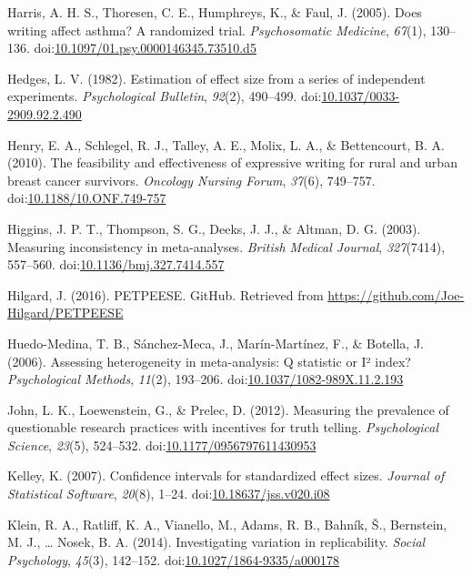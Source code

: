 \documentclass[english,man]{apa6}
\theoremstyle{definition}
\theoremstyle{definition}
\theoremstyle{definition}
\theoremstyle{remark}
\begin{document}
\hypertarget{ref-Harris2005}{}
Harris, A. H. S., Thoresen, C. E., Humphreys, K., \& Faul, J. (2005).
Does writing affect asthma? A randomized trial. \emph{Psychosomatic
Medicine}, \emph{67}(1), 130--136.
doi:\href{https://doi.org/10.1097/01.psy.0000146345.73510.d5}{10.1097/01.psy.0000146345.73510.d5}

\hypertarget{ref-Hedges1982}{}
Hedges, L. V. (1982). Estimation of effect size from a series of
independent experiments. \emph{Psychological Bulletin}, \emph{92}(2),
490--499.
doi:\href{https://doi.org/10.1037/0033-2909.92.2.490}{10.1037/0033-2909.92.2.490}

\hypertarget{ref-Henry2010}{}
Henry, E. A., Schlegel, R. J., Talley, A. E., Molix, L. A., \&
Bettencourt, B. A. (2010). The feasibility and effectiveness of
expressive writing for rural and urban breast cancer survivors.
\emph{Oncology Nursing Forum}, \emph{37}(6), 749--757.
doi:\href{https://doi.org/10.1188/10.ONF.749-757}{10.1188/10.ONF.749-757}

\hypertarget{ref-Higgins2003}{}
Higgins, J. P. T., Thompson, S. G., Deeks, J. J., \& Altman, D. G.
(2003). Measuring inconsistency in meta-analyses. \emph{British Medical
Journal}, \emph{327}(7414), 557--560.
doi:\href{https://doi.org/10.1136/bmj.327.7414.557}{10.1136/bmj.327.7414.557}

\hypertarget{ref-Hilgard2016}{}
Hilgard, J. (2016). PETPEESE. GitHub. Retrieved from
\url{https://github.com/Joe-Hilgard/PETPEESE}

\hypertarget{ref-Huedo-Medina2006}{}
Huedo-Medina, T. B., Sánchez-Meca, J., Marín-Martínez, F., \& Botella,
J. (2006). Assessing heterogeneity in meta-analysis: Q statistic or I²
index? \emph{Psychological Methods}, \emph{11}(2), 193--206.
doi:\href{https://doi.org/10.1037/1082-989X.11.2.193}{10.1037/1082-989X.11.2.193}

\hypertarget{ref-John2012}{}
John, L. K., Loewenstein, G., \& Prelec, D. (2012). Measuring the
prevalence of questionable research practices with incentives for truth
telling. \emph{Psychological Science}, \emph{23}(5), 524--532.
doi:\href{https://doi.org/10.1177/0956797611430953}{10.1177/0956797611430953}

\hypertarget{ref-Kelley2007}{}
Kelley, K. (2007). Confidence intervals for standardized effect sizes.
\emph{Journal of Statistical Software}, \emph{20}(8), 1--24.
doi:\href{https://doi.org/10.18637/jss.v020.i08}{10.18637/jss.v020.i08}

\hypertarget{ref-Klein2014a}{}
Klein, R. A., Ratliff, K. A., Vianello, M., Adams, R. B., Bahník, Š.,
Bernstein, M. J., \ldots{} Nosek, B. A. (2014). Investigating variation
in replicability. \emph{Social Psychology}, \emph{45}(3), 142--152.
doi:\href{https://doi.org/10.1027/1864-9335/a000178}{10.1027/1864-9335/a000178}
\end{document}
